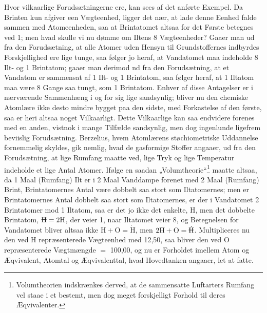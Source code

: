 \documentclass[12pt,a4paper]{book}
\begin{document}
Hvor vilkaarlige Forudsætningerne ere, kan sees af det
anførte Exempel. Da Brinten kun afgiver een Vægteenhed,
ligger det nær, at lade denne Eenhed falde sammen med
Atomeenheden, saa at Brintatomet altsaa for det Første betegnes
ved 1; men hvad skulle vi nu dømme om Iltens 8
Vægteenheder? Gaaer man ud fra den Forudsætning, at alle
Atomer uden Hensyn til Grundstoffernes indbyrdes Forskjellighed
ere lige tunge, saa følger jo heraf, at Vandatomet
maa indeholde 8 Ilt- og 1 Brintatom; gaaer man derimod
nd fra den Forudsætning, at et Vandatom er sammensat af
1 Ilt- og 1 Brintatom, saa følger heraf, at 1 Iltatom maa
være 8 Gange saa tungt, som 1 Brintatom. Enhver af
disse Antagelser er i nærværende Sammenhæng i og for sig
lige sandsynlig; bliver nu den chemiske Atomlære ikke desto
mindre bygget paa den sidste, med Forkastelse af den første,
saa er heri altsaa noget Vilkaarligt. Dette Vilkaarlige kan
saa endvidere forenes med en anden, vistnok i mange Tilfælde
sandsynlig, men dog ingenlunde ligefrem beviislig Forudsætning.
Berzelius, hvem Atomlærens støchiometriske Uddannelse
fornemmelig skyldes, gik nemlig, hvad de gasformige
\setcounter{footnote}{0}
Stoffer angaaer, ud fra den Forudsætning, at lige Rumfang
maatte ved, lige Tryk og lige Temperatur indeholde et lige
Antal Atomer. Ifølge en saadan „Volumtheorie“\footnote{Volumtheorien
indskrænkes derved, at de sammensatte Luftarters
Rumfang vel staae i et bestemt, men dog meget forskjelligt Forhold
til deres Æqvivalenter.} maatte
altsaa, da 1 Maal (Rumfang) Ilt er i 2 Maal Vanddampe
forenet med 2 Maal (Rumfang) Brint, Brintatomernes Antal
være dobbelt saa stort som Iltatomernes; men er Brintatomernes
Antal dobbelt saa stort som Iltatomernes, er der
i Vandatomet 2 Brintatomer mod 1 Iltatom, saa er det jo
ikke det enkelte, $\mathrm{H}$, men det dobbelte Brintatom,
$\rlap{\rule[0.8ex]{0.75em}{0.4pt}}\mathrm{H} = 2\mathrm{H}$,
der veier 1, naar Iltatomet veier 8, og Betegnelsen for
Vandatomet bliver altsaa ikke $\mathrm{H} + \mathrm{O} =
\dot{\mathrm{H}}$, men $2\mathrm{H} + \mathrm{O} =
\dot{\rlap{\rule[0.8ex]{0.75em}{0.4pt}}\mathrm{H}}$.
Multipliceres nu den ved $\mathrm{H}$ repræsenterede Vægteenhed med
12,50, saa bliver den ved $\mathrm{O}$ repræsenterede Vægtmængde $=$
100,00, og nu er Forholdet imellem Atom og Æqvivalent,
Atomtal og Æqvivalenttal, hvad Hovedtanken angaaer, let
at fatte.
\end{document}
